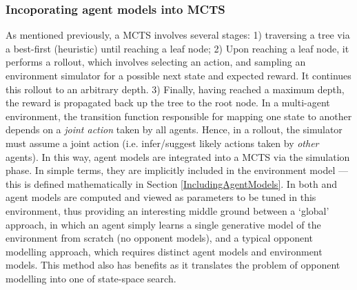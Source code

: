 \subsubsection{Incoporating agent models into MCTS}
As mentioned previously, a MCTS involves several stages: 1) traversing a tree via a best-first (heuristic) until reaching a leaf node; 2) Upon reaching a leaf node, it performs a rollout, which involves selecting an action, and sampling an environment simulator for a possible next state and expected reward. It continues this rollout to an arbitrary depth. 3) Finally, having reached a maximum depth, the reward is propagated back up the tree to the root node.
\newline \newline 
In a multi-agent environment, the transition function responsible for mapping one state to another depends on a \textit{joint action} taken by all agents. Hence, in a rollout, the simulator must assume a joint action (i.e. infer/suggest likely actions taken by \textit{other} agents). In this way, agent models are integrated into a MCTS via the simulation phase. In simple terms, they are implicitly included in the environment model --- this is defined mathematically in Section \ref{IncludingAgentModels}. In both \cite{Hayashi_et_al2020} and \cite{Albrecht_stone_2019} agent models are computed and viewed as parameters to be tuned in this environment, thus providing an interesting middle ground between a `global' approach, in which an agent simply learns a single generative model of  the environment from scratch (no opponent models), and a typical opponent modelling approach, which requires distinct agent models and environment models.
\newline \newline
This method also has benefits as it translates the problem of opponent modelling into one of state-space search.